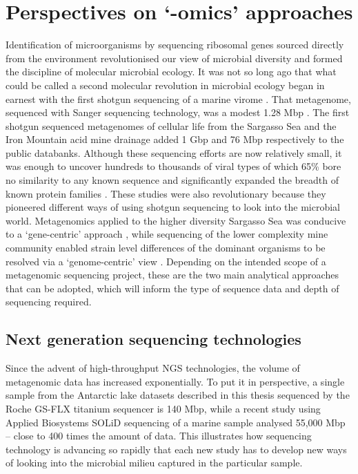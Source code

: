 \section{Perspectives on `-omics' approaches }
Identification of microorganisms by sequencing ribosomal genes sourced directly from the environment \cite{Stahl1985} revolutionised our view of microbial diversity and formed the discipline of molecular microbial ecology. 
It was not so long ago that what could be called a second molecular revolution in microbial ecology began in earnest with the first shotgun sequencing of a marine virome \cite{Breitbart2002}.
That metagenome, sequenced with Sanger sequencing technology, was a modest 1.28 Mbp \cite{Breitbart2002}.
The first shotgun sequenced metagenomes of cellular life from the Sargasso Sea \cite{Venter2004} and the Iron Mountain acid mine drainage \cite{Tyson2004} added 1 Gbp and 76 Mbp respectively to the public databanks.
Although these sequencing efforts are now relatively small, it was enough to uncover hundreds to thousands of viral types of which 65\% bore no similarity to any known sequence \cite{Breitbart2002} and significantly expanded the breadth of known protein families \cite{Venter2004}.  
These studies were also revolutionary because they pioneered different ways of using shotgun sequencing to look into the microbial world.
Metagenomics applied to the higher diversity Sargasso Sea was conducive to a `gene-centric' approach \cite{Venter2004}, while sequencing of the lower complexity mine community enabled strain level differences of the dominant organisms to be resolved via a `genome-centric' view \cite{Tyson2004}.
Depending on the intended scope of a metagenomic sequencing project, these are the two main analytical approaches that can be adopted, which will inform the type of sequence data and depth of sequencing required.

\subsection{Next generation sequencing technologies}
Since the advent of high-throughput \ac{NGS} technologies, the volume of metagenomic data has increased exponentially.
To put it in perspective, a single sample from the Antarctic lake datasets described in this thesis sequenced by the Roche GS-FLX titanium sequencer is 140 Mbp, while a recent study using Applied Biosystems SOLiD sequencing of a marine sample \cite{Iverson2012} analysed 55,000 Mbp -- close to 400 times the amount of data.
This illustrates how sequencing technology is advancing so rapidly that each new study has to develop new ways of looking into the microbial milieu captured in the particular sample.

